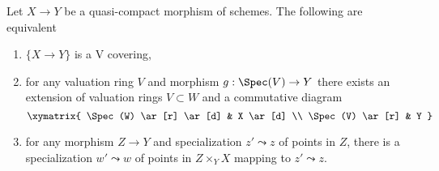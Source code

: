 \begin{lemma}
\label{lemma-refine-qcqs-V}
Let $X \to Y$ be a quasi-compact morphism of schemes.
The following are equivalent
\begin{enumerate}
\item $\{X \to Y\}$ is a V covering,
\item for any valuation ring $V$ and morphism $g : \Spec(V) \to Y$
there exists an extension of valuation rings $V \subset W$
and a commutative diagram
$$
\xymatrix{
\Spec(W) \ar[r] \ar[d] & X \ar[d] \\
\Spec(V) \ar[r] & Y
}
$$
\item for any morphism $Z \to Y$ and specialization $z' \leadsto z$
of points in $Z$, there is a specialization $w' \leadsto w$
of points in $Z \times_Y X$ mapping to $z' \leadsto z$.
\end{enumerate}
\end{lemma}

